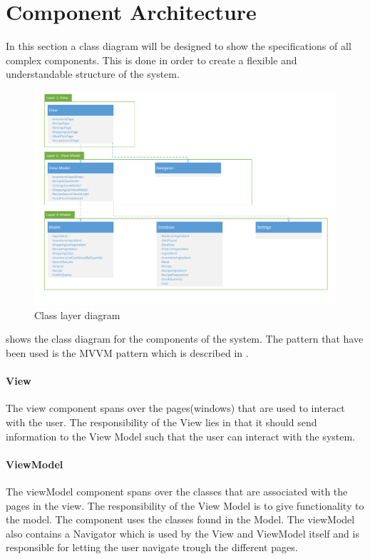 \section{Component Architecture} \label{ComponentArchitecture}
In this section a class diagram will be designed to show the specifications of all complex
components. This is done in order to create a flexible and understandable structure of the system.

\begin{figure}[H]
\includegraphics[width=\linewidth]{Grafik/FoodPlanner/ComponentDiagram}
\centering
\caption{Class layer diagram}
\label{LayerDiagram}
\end{figure}

 shows the class diagram for the components of the system. The pattern that have been
used is the MVVM pattern which is described in .

\paragraph{View}
The view component spans over the pages(windows) that are used to interact with the user. The responsibility of the View lies in that it should send information to the View Model such that the user can interact with the system.

\paragraph{ViewModel}
The viewModel component spans over the classes that are associated with the pages in the view. The responsibility of the View Model is to give functionality to the model. The component uses the classes found in the Model. The viewModel also contains a Navigator which is used by the View and ViewModel itself and is responsible for letting the user navigate trough the different pages.

